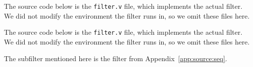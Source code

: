 \seqfilter
\label{app:source:seq}

The source code below is the \texttt{filter.v} file, which implements the actual filter.
We did not modify the environment the filter runs in, so we omit these files here.



\strengthfilter
\label{app:source:strength}

The source code below is the \texttt{filter.v} file, which implements the actual filter.
We did not modify the environment the filter runs in, so we omit these files here.



The subfilter mentioned here is the filter from Appendix~\ref{app:source:seq}.
